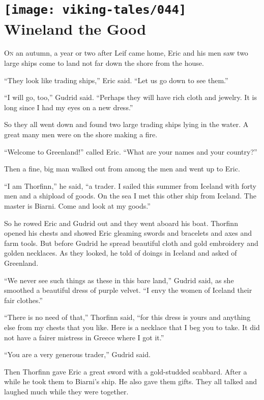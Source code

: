 \chapter[Wineland the Good]{
    \texttt{[image: viking-tales/044]}\\
    Wineland the Good}

\lettrine{O}{n} an autumn, a year or two after Leif came home, Eric and
his men saw two large ships come to land not far down the shore from the
house.

``They look like trading ships,'' Eric said. ``Let us go down to see
them.''

``I will go, too,'' Gudrid said. ``Perhaps they will have rich cloth and
jewelry. It is long since I had my eyes on a new dress.''

So they all went down and found two large trading ships lying in the
water. A great many men were on the shore making a fire.

``Welcome to Greenland!'' called Eric. ``What are your names and your
country?''

Then a fine, big man walked out from among the men and went up to Eric.

``I am Thorfinn,'' he said, ``a trader. I sailed this summer from
Iceland with forty men and a shipload of goods. On the sea I met this
other ship from Iceland. The master is Biarni. Come and look at my
goods.''

So he rowed Eric and Gudrid out and they went aboard his boat. Thorfinn
opened his chests and showed Eric gleaming swords and bracelets and axes
and farm tools. But before Gudrid he spread beautiful cloth and gold
embroidery and golden necklaces. As they looked, he told of doings in
Iceland and asked of Greenland.

``We never see such things as these in this bare land,'' Gudrid said, as
she smoothed a beautiful dress of purple velvet. ``I envy the women of
Iceland their fair clothes.''

``There is no need of that,'' Thorfinn said, ``for this dress is yours
and anything else from my chests that you like. Here is a necklace that
I beg you to take. It did not have a fairer mistress in Greece where I
got it.''

``You are a very generous trader,'' Gudrid said.

Then Thorfinn gave Eric a great sword with a gold-studded scabbard.
After a while he took them to Biarni's ship. He also gave them gifts.
They all talked and laughed much while they were together.

